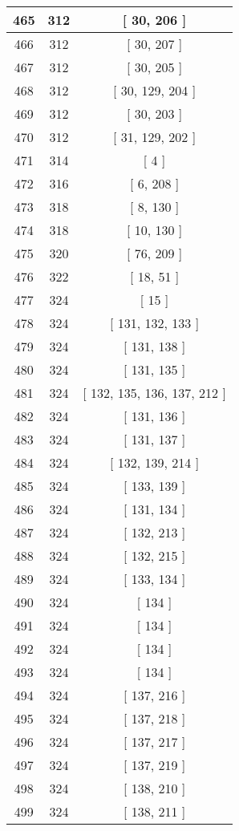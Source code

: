 \begin{center}
\begin{longtable}[H]{|| c c c ||}
465 & 312 & [ 30, 206 ] \\ 
\hline
466 & 312 & [ 30, 207 ] \\ 
\hline
467 & 312 & [ 30, 205 ] \\ 
\hline
468 & 312 & [ 30, 129, 204 ] \\ 
\hline
469 & 312 & [ 30, 203 ] \\ 
\hline
470 & 312 & [ 31, 129, 202 ] \\ 
\hline
471 & 314 & [ 4 ] \\ 
\hline
472 & 316 & [ 6, 208 ] \\ 
\hline
473 & 318 & [ 8, 130 ] \\ 
\hline
474 & 318 & [ 10, 130 ] \\ 
\hline
475 & 320 & [ 76, 209 ] \\ 
\hline
476 & 322 & [ 18, 51 ] \\ 
\hline
477 & 324 & [ 15 ] \\ 
\hline
478 & 324 & [ 131, 132, 133 ] \\ 
\hline
479 & 324 & [ 131, 138 ] \\ 
\hline
480 & 324 & [ 131, 135 ] \\ 
\hline
481 & 324 & [ 132, 135, 136, 137, 212 ] \\ 
\hline
482 & 324 & [ 131, 136 ] \\ 
\hline
483 & 324 & [ 131, 137 ] \\ 
\hline
484 & 324 & [ 132, 139, 214 ] \\ 
\hline
485 & 324 & [ 133, 139 ] \\ 
\hline
486 & 324 & [ 131, 134 ] \\ 
\hline
487 & 324 & [ 132, 213 ] \\ 
\hline
488 & 324 & [ 132, 215 ] \\ 
\hline
489 & 324 & [ 133, 134 ] \\ 
\hline
490 & 324 & [ 134 ] \\ 
\hline
491 & 324 & [ 134 ] \\ 
\hline
492 & 324 & [ 134 ] \\ 
\hline
493 & 324 & [ 134 ] \\ 
\hline
494 & 324 & [ 137, 216 ] \\ 
\hline
495 & 324 & [ 137, 218 ] \\ 
\hline
496 & 324 & [ 137, 217 ] \\ 
\hline
497 & 324 & [ 137, 219 ] \\ 
\hline
498 & 324 & [ 138, 210 ] \\ 
\hline
499 & 324 & [ 138, 211 ] \\ 

\end{longtable}
\end{center}

